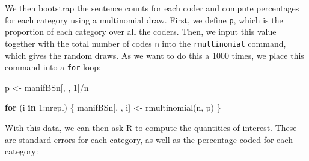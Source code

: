 \documentclass[
]{article}
\newenvironment{Shaded}{\begin{snugshade}}{\end{snugshade}}
\newcommand{\ControlFlowTok}[1]{\textcolor[rgb]{0.13,0.29,0.53}{\textbf{#1}}}
\newcommand{\DecValTok}[1]{\textcolor[rgb]{0.00,0.00,0.81}{#1}}
\newcommand{\FunctionTok}[1]{\textcolor[rgb]{0.00,0.00,0.00}{#1}}
\newcommand{\NormalTok}[1]{#1}
\newcommand{\OtherTok}[1]{\textcolor[rgb]{0.56,0.35,0.01}{#1}}
\newcommand{\SpecialCharTok}[1]{\textcolor[rgb]{0.00,0.00,0.00}{#1}}
\begin{document}
We then bootstrap the sentence counts for each coder and compute percentages for each category using a multinomial draw. First, we define \texttt{p}, which is the proportion of each category over all the coders. Then, we input this value together with the total number of codes \texttt{n} into the \texttt{rmultinomial} command, which gives the random draws. As we want to do this a 1000 times, we place this command into a \texttt{for} loop:

\begin{Shaded}
\begin{Highlighting}[]
\NormalTok{p }\OtherTok{\textless{}{-}}\NormalTok{ manifBSn[, , }\DecValTok{1}\NormalTok{]}\SpecialCharTok{/}\NormalTok{n}

\ControlFlowTok{for}\NormalTok{ (i }\ControlFlowTok{in} \DecValTok{1}\SpecialCharTok{:}\NormalTok{nrepl) \{}
\NormalTok{    manifBSn[, , i] }\OtherTok{\textless{}{-}} \FunctionTok{rmultinomial}\NormalTok{(n, p)}
\NormalTok{\}}
\end{Highlighting}
\end{Shaded}

With this data, we can then ask R to compute the quantities of interest. These are standard errors for each category, as well as the percentage coded for each category:
\end{document}
